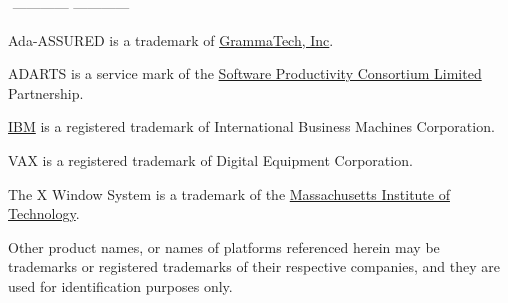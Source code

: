 ${}${}
\vfill
\noindent
------------ ------------

\footnotesize{
\noindent
Ada-ASSURED is a trademark of \href{http://www.grammatech.com}{GrammaTech, Inc}.

\noindent
ADARTS  is a service mark of the
\href{http://www.software.org}{Software Productivity Consortium Limited}
Partnership.

\noindent
\href{http://www.ibm.com}{IBM} is a registered trademark of International
 Business Machines Corporation.

\noindent
VAX is a registered trademark of Digital Equipment Corporation.

\noindent
The X Window System is a trademark of the
\href{http://www.mit.edu}{Massachusetts Institute of Technology}.

\noindent
Other product names, or names of platforms referenced herein may be
trademarks or registered trademarks of their respective
companies, and they are used for identification purposes only.
}
